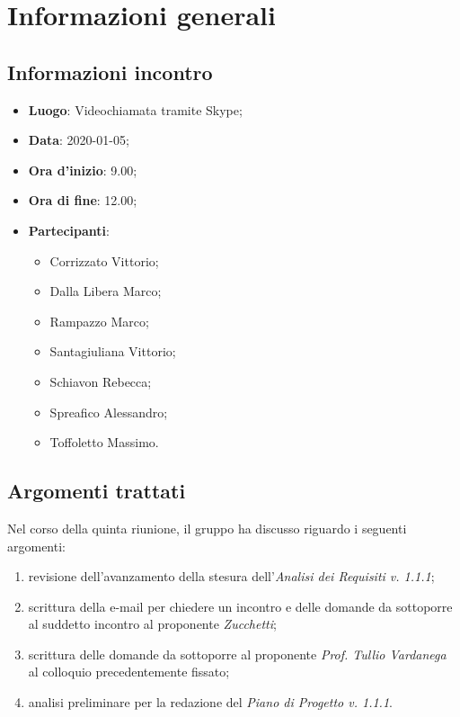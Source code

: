 \section{Informazioni generali}
    \subsection{Informazioni incontro}
        \begin{itemize}
            \item \textbf{Luogo}: Videochiamata tramite Skype;
            \item \textbf{Data}: 2020-01-05;
            \item \textbf{Ora d'inizio}: 9.00;
            \item \textbf{Ora di fine}: 12.00;
            \item \textbf{Partecipanti}: \begin{itemize}
                \item Corrizzato Vittorio;
                \item Dalla Libera Marco;
                \item Rampazzo Marco;
                \item Santagiuliana Vittorio;
                \item Schiavon Rebecca;
                \item Spreafico Alessandro;
                \item Toffoletto Massimo.
            \end{itemize}
        \end{itemize}
    \subsection{Argomenti trattati}
        Nel corso della quinta riunione, il gruppo ha discusso riguardo i seguenti argomenti:
        \begin{enumerate}
            \item revisione dell'avanzamento della stesura dell'\textit{Analisi dei Requisiti v. 1.1.1}; 
            \item scrittura della e-mail per chiedere un incontro e delle domande da sottoporre al suddetto incontro al proponente \textit{Zucchetti};
            \item scrittura delle domande da sottoporre al proponente \textit{Prof. Tullio Vardanega} al colloquio precedentemente fissato;
            \item analisi preliminare per la redazione del \textit{Piano di Progetto v. 1.1.1}.
        \end{enumerate}
